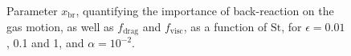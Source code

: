 \documentclass[a4paper,fleqn,usenatbib]{mnras}
\newcommand{\St}{\mathrm{St}}         %
\begin{document}
\begin{figure}
\centering
{}
\caption{Parameter $x_\mathrm{br}$, quantifying the importance of back-reaction on the gas motion, as well as $f_\mathrm{drag}$ and $f_\mathrm{visc}$, as a function of $\St$, for $\epsilon=0.01$, 0.1 and 1, and $\alpha = 10^{-2}$.}
\label{Fig:x_br}
\end{figure}

%







\bsp	%
\label{lastpage}
\end{document}
